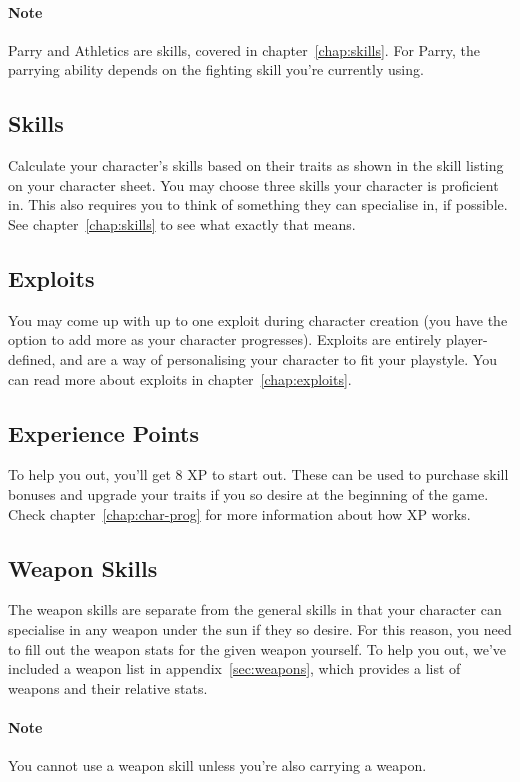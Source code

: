 \paragraph{Note} Parry and Athletics are skills, covered in chapter~\ref{chap:skills}.
For Parry, the parrying ability depends on the fighting skill you're currently using.

\subsection{Skills}
Calculate your character's skills based on their traits as shown in the skill listing on your character sheet.
You may choose three skills your character is proficient in.
This also requires you to think of something they can specialise in, if possible.
See chapter~\ref{chap:skills} to see what exactly that means.

\subsection{Exploits}
You may come up with up to one exploit during character creation (you have the option to add more as your character progresses).
Exploits are entirely player-defined, and are a way of personalising your character to fit your playstyle.
You can read more about exploits in chapter~\ref{chap:exploits}.

\subsection{Experience Points}
To help you out, you'll get 8 XP to start out.
These can be used to purchase skill bonuses and upgrade your traits if you so desire at the beginning of the game.
Check chapter~\ref{chap:char-prog} for more information about how XP works.

\subsection{Weapon Skills}
The weapon skills are separate from the general skills in that your character can specialise in any weapon under the sun if they so desire.
For this reason, you need to fill out the weapon stats for the given weapon yourself.
To help you out, we've included a weapon list in appendix~\ref{sec:weapons}, which provides a list of weapons and their relative stats.

\paragraph{Note} You cannot use a weapon skill unless you're also carrying a weapon.

